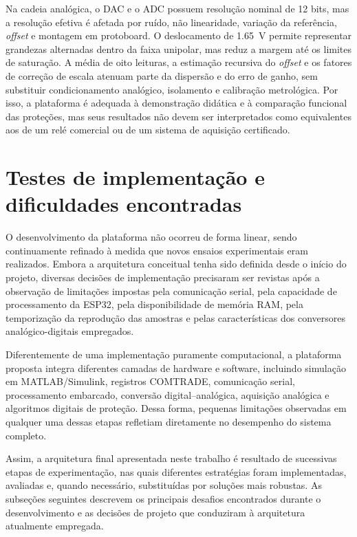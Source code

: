 Na cadeia analógica, o DAC e o ADC possuem resolução nominal de 12 bits, mas a resolução efetiva é afetada por ruído, não linearidade, variação da referência, \textit{offset} e montagem em protoboard. O deslocamento de \SI{1,65}{\volt} permite representar grandezas alternadas dentro da faixa unipolar, mas reduz a margem até os limites de saturação. A média de oito leituras, a estimação recursiva do \textit{offset} e os fatores de correção de escala atenuam parte da dispersão e do erro de ganho, sem substituir condicionamento analógico, isolamento e calibração metrológica. Por isso, a plataforma é adequada à demonstração didática e à comparação funcional das proteções, mas seus resultados não devem ser interpretados como equivalentes aos de um relé comercial ou de um sistema de aquisição certificado.

\section{Testes de implementação e dificuldades encontradas}

O desenvolvimento da plataforma não ocorreu de forma linear, sendo continuamente refinado à medida que novos ensaios experimentais eram realizados. Embora a arquitetura conceitual tenha sido definida desde o início do projeto, diversas decisões de implementação precisaram ser revistas após a observação de limitações impostas pela comunicação serial, pela capacidade de processamento da ESP32, pela disponibilidade de memória RAM, pela temporização da reprodução das amostras e pelas características dos conversores analógico-digitais empregados.

Diferentemente de uma implementação puramente computacional, a plataforma proposta integra diferentes camadas de hardware e software, incluindo simulação em MATLAB/Simulink, registros COMTRADE, comunicação serial, processamento embarcado, conversão digital--analógica, aquisição analógica e algoritmos digitais de proteção. Dessa forma, pequenas limitações observadas em qualquer uma dessas etapas refletiam diretamente no desempenho do sistema completo.

Assim, a arquitetura final apresentada neste trabalho é resultado de sucessivas etapas de experimentação, nas quais diferentes estratégias foram implementadas, avaliadas e, quando necessário, substituídas por soluções mais robustas. As subseções seguintes descrevem os principais desafios encontrados durante o desenvolvimento e as decisões de projeto que conduziram à arquitetura atualmente empregada.

